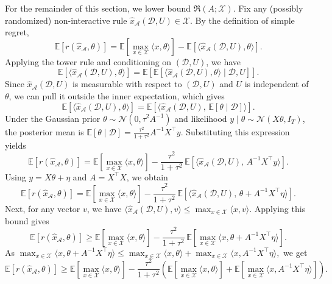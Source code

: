 For the remainder of this section, we lower bound $\mathfrak R(A;\mathcal X)$.
Fix any (possibly randomized) non-interactive rule $\hat x_{\mathcal A}(\mathcal D,U)\in\mathcal X$.
By the definition of simple regret,
\[
\mathbb{E}[r(\hat x_{\mathcal A},\theta)]
=
\mathbb{E}\!\left[\max_{x\in\mathcal X}\langle x,\theta\rangle\right]
-
\mathbb{E}\!\left[\langle \hat x_{\mathcal A}(\mathcal D,U),\theta\rangle\right].
\]
Applying the tower rule and conditioning on $(\mathcal D,U)$, we have
\[
\mathbb{E}\!\left[\langle \hat x_{\mathcal A}(\mathcal D,U),\theta\rangle\right]
=
\mathbb{E}\!\left[
\mathbb{E}\!\left[\langle \hat x_{\mathcal A}(\mathcal D,U),\theta\rangle \mid \mathcal D,U\right]
\right].
\]
Since $\hat x_{\mathcal A}(\mathcal D,U)$ is measurable with respect to $(\mathcal D,U)$ and $U$ is independent of $\theta$, we can pull it outside the inner expectation, which gives
\[
\mathbb{E}\!\left[\langle \hat x_{\mathcal A}(\mathcal D,U),\theta\rangle\right]=
\mathbb{E}\!\left[
\big\langle \hat x_{\mathcal A}(\mathcal D,U),\, \mathbb{E}[\theta\mid \mathcal D]\big\rangle
\right].
\]
Under the Gaussian prior $\theta\sim\mathcal N(0,\tau^2A^{-1})$ and likelihood $y\mid\theta\sim\mathcal N(X\theta,I_T)$, the posterior mean is
$\mathbb{E}[\theta\mid\mathcal D]=\frac{\tau^2}{1+\tau^2}A^{-1}X^\top y$.
Substituting this expression yields
\[
\mathbb{E}[r(\hat x_{\mathcal A},\theta)]
=
\mathbb{E}\!\left[\max_{x\in\mathcal X}\langle x,\theta\rangle\right]
-
\frac{\tau^2}{1+\tau^2}\,
\mathbb{E}\!\left[
\big\langle \hat x_{\mathcal A}(\mathcal D,U),\, A^{-1}X^\top y\big\rangle
\right].
\]
Using $y=X\theta+\eta$ and $A=X^\top X$, we obtain
\[
\mathbb{E}[r(\hat x_{\mathcal A},\theta)]=
\mathbb{E}\!\left[\max_{x\in\mathcal X}\langle x,\theta\rangle\right]
-
\frac{\tau^2}{1+\tau^2}\,
\mathbb{E}\!\left[
\big\langle \hat x_{\mathcal A}(\mathcal D,U),\, \theta + A^{-1}X^\top\eta\big\rangle
\right].
\]
Next, for any vector $v$, we have
$\langle \hat x_{\mathcal A}(\mathcal D,U),v\rangle
\le \max_{x\in\mathcal X}\langle x,v\rangle$.
Applying this bound gives
\[
\mathbb{E}[r(\hat x_{\mathcal A},\theta)]\ge
\mathbb{E}\!\left[\max_{x\in\mathcal X}\langle x,\theta\rangle\right]
-
\frac{\tau^2}{1+\tau^2}\,
\mathbb{E}\!\left[
\max_{x\in\mathcal X}\langle x,\theta + A^{-1}X^\top\eta\rangle
\right].
\]
As $\max_{x\in\mathcal{X}}\langle x,\theta + A^{-1}X^\top\eta\rangle
\le
\max_{x\in\mathcal{X}}\langle x,\theta\rangle
+
\max_{x\in\mathcal{X}}\langle x,A^{-1}X^\top\eta\rangle,$ we get
\[
\mathbb{E}[r(\hat x_{\mathcal A},\theta)]\ge
\mathbb{E}\!\left[\max_{x\in\mathcal X}\langle x,\theta\rangle\right]
-
\frac{\tau^2}{1+\tau^2}
\left(
\mathbb{E}\!\left[\max_{x\in\mathcal X}\langle x,\theta\rangle\right]
+
\mathbb{E}\!\left[\max_{x\in\mathcal X}\langle x,A^{-1}X^\top\eta\rangle\right]
\right).
\]

